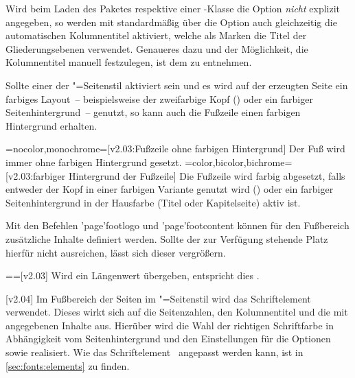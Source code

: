 \begin{DeclareEntity*}{}
\begin{DeclareEntity*}{}
\begin{DeclareEntity*}{}
\begin{Declaration}
%
Wird beim Laden des Paketes  respektive einer 
\TUDScript-Klasse die Option  
\emph{nicht} explizit angegeben, so werden mit  
standardmäßig über die Option  auch 
gleichzeitig die automatischen Kolumnentitel aktiviert, welche als Marken die 
Titel der Gliederungsebenen verwendet. Genaueres dazu und der Möglichkeit, die 
Kolumnentitel manuell festzulegen, ist dem \scrguide zu entnehmen.

Sollte einer der "=Seitenstil aktiviert sein und es wird 
auf der erzeugten Seite ein farbiges Layout~--  beispielsweise der zweifarbige 
Kopf () oder ein farbiger Seitenhintergrund~-- genutzt, 
so kann auch die Fußzeile einen farbigen Hintergrund erhalten.
\begin{DeclareValues}
\itemval=nocolor,monochrome=[v2.03:Fußzeile ohne farbigen Hintergrund]
  Der Fuß wird immer ohne farbigen Hintergrund gesetzt.
\itemval=color,bicolor,bichrome=[v2.03:farbiger Hintergrund der Fußzeile]
  Die Fußzeile wird farbig abgesetzt, falls entweder der Kopf in einer farbigen
  Variante genutzt wird () oder ein 
  farbiger Seitenhintergrund in der Hausfarbe (Titel oder Kapitelseite) aktiv 
  ist.
\end{DeclareValues}

Mit den Befehlen \Macro'page'{footlogo} und \Macro'page'{footcontent} können 
für den Fußbereich zusätzliche Inhalte definiert werden. Sollte der zur 
Verfügung stehende Platz hierfür nicht ausreichen, lässt sich dieser vergrößern.
\begin{DeclareValues}
\itemval=\PLength=[v2.03]
  Wird ein Längenwert übergeben, entspricht dies 
  .
\end{DeclareValues}
%
\end{Declaration}

\begin{Declaration}
  {}
  [v2.04]
Im Fußbereich der Seiten im "=Seitenstil wird das 
Schriftelement~ verwendet. Dieses wirkt sich auf die 
Seitenzahlen, den Kolumnentitel und die mit  angegebenen 
Inhalte aus. Hierüber wird die Wahl der richtigen Schriftfarbe in Abhängigkeit 
vom Seitenhintergrund und den Einstellungen für die Optionen  
sowie  realisiert. Wie das Schriftelement~ 
angepasst werden kann, ist in \autoref{sec:fonts:elements} zu finden.
\end{Declaration}


\end{DeclareEntity*}
\end{DeclareEntity*}
\end{DeclareEntity*}
